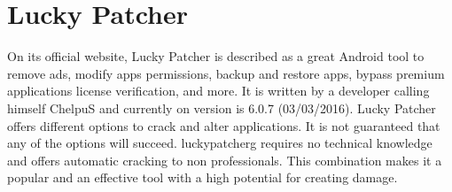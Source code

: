 \section{Lucky Patcher} \label{section:luckypatcher-explain}
On its official website, Lucky Patcher is described as \grqq[...] a great Android tool to remove ads, modify apps permissions, backup and restore apps, bypass premium applications license verification, and more\grqq \cite{luckyPatcherOfficial}.
It is written by a developer calling himself ChelpuS and currently on version is 6.0.7 (03/03/2016).
\newline
Lucky Patcher offers different options to crack and alter applications.
It is not guaranteed that any of the options will succeed. \cite{luckyPatcherOfficial}
\newline
\gls{luckypatcherg} requires no technical knowledge and offers automatic cracking to non professionals.
This combination makes it a popular and an effective tool with a high potential for creating damage.
\newline
